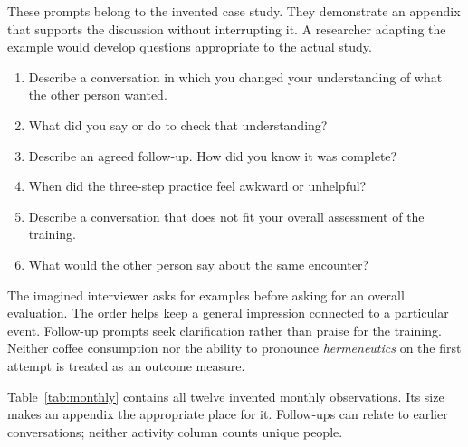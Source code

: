 \documentclass[font=termes]{mbts}
\begin{document}
\label{app:protocol}
These prompts belong to the invented case study. They demonstrate an appendix
that supports the discussion without interrupting it. A researcher adapting
the example would develop questions appropriate to the actual study.

\begin{enumerate}
  \setlength{\itemsep}{0pt}
  \setlength{\parsep}{0pt}
  \item Describe a conversation in which you changed your understanding of
    what the other person wanted.
  \item What did you say or do to check that understanding?
  \item Describe an agreed follow-up. How did you know it was complete?
  \item When did the three-step practice feel awkward or unhelpful?
  \item Describe a conversation that does not fit your overall assessment
    of the training.
  \item What would the other person say about the same encounter?
\end{enumerate}

The imagined interviewer asks for examples before asking for an overall
evaluation. The order helps keep a general impression connected to a
particular event. Follow-up prompts seek clarification rather than praise
for the training. Neither coffee consumption nor the ability to pronounce
\textit{hermeneutics} on the first attempt is treated as an outcome measure.

\label{app:records}
Table~\ref{tab:monthly} contains all twelve invented monthly observations.
Its size makes an appendix the appropriate place for it. Follow-ups can
relate to earlier conversations; neither activity column counts unique people.
\end{document}
